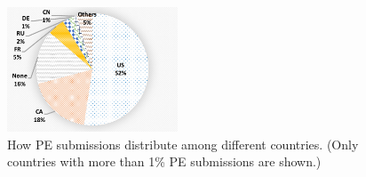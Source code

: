 \begin{figure}[t!]
\begin{center}
\includegraphics[width=2in]{figure/countryPie}
\caption{How PE submissions distribute among different countries.
(Only countries with more than 1\% PE submissions are shown.)
}
\label{fig:countryPie}
\end{center}
\end{figure}